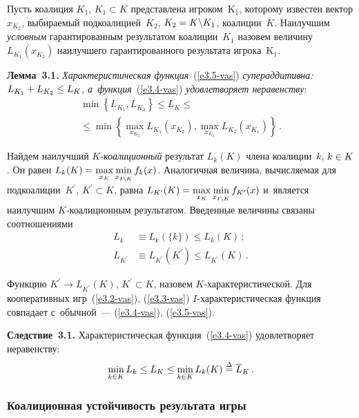 \begin{multicols}{2}
    Пусть коалиция $K_1$, $K_1\subset K$ представлена игроком~K$_1$, которому
известен вектор $x_{K_2}$, выбира\-емый подкоалицией~$K_2$, $K_2\hm=
K\backslash K_1$, коалиции~$K$. Наилучшим \textit{условным} гарантированным
результатом коалиции~$K_1$ назовем величину $L_{K_1}(x_{K_2})$ наилучшего
гарантированного результата игрока~K$_1$.

    \smallskip

    \noindent
    \textbf{Лемма~3.1.} \textit{Характеристическая функция}~(\ref{e3.5-vas})
\textit{супераддитивна: $L_{K_1}\hm+ L_{K_2}\hm\leq L_K$,
     а~функция}~(\ref{e3.4-vas}) \textit{удовлетворяет неравенству}:
    \begin{multline*}
    \min \left\{ L_{K_1}, L_{K_2}\right\} \leq L_K \leq{}\\
    {}\leq \min \left\{ \max\limits_{x_{K_2}}
L_{K_1}(x_{K_2}), \max\limits_{x_{K_1}} L_{K_2}(x_{K_1})\right\}\,.
    \end{multline*}

    \smallskip

    Найдем наилучший $K$-\textit{коалиционный} результат $L_k(K)$ члена
коалиции~$k$, $k\hm\in K$. Он равен $L_k(K)\hm= \max\limits_{x_K}
\min\limits_{x_{I\backslash K}} f_k(x)$. Аналогичная величина, вычисляемая для
подкоалиции~$K^\prime$, $K^\prime \subset K$, равна $L_{K^\prime}(K) \hm=
\max\limits_{x_K} \min\limits_{x_{I\backslash K}} f_{K^\prime}(x)$ и~является
наилучшим \mbox{$K$-коа}\-ли\-ци\-он\-ным результатом. Введенные величины связаны
соотношениями
    \begin{align*}
    L_k&\equiv L_k(\{k\})\leq L_k(K)\,;\\
    L_{K^\prime} &\equiv L_{K^\prime}
(K^\prime) \leq L_{K^\prime} (K)\,.
    \end{align*}

    Функцию $K^\prime \to L_{K^\prime} (K)$, $K^\prime \subset K$, назовем
    \mbox{$K$-ха}\-рак\-те\-ри\-сти\-че\-ской. Для кооперативных игр~(\ref{e3.2-vas}),
(\ref{e3.3-vas}) $I$-ха\-рак\-те\-ри\-сти\-че\-ская функция совпадает с~обычной~---
(\ref{e3.4-vas}), (\ref{e3.5-vas}).

    \smallskip

    \noindent
    \textbf{Следствие~3.1.} Характеристическая функция~(\ref{e3.4-vas})
удовлетворяет неравенству:
$$
\min\limits_{k\in K} L_k\leq L_K\leq
\min\limits_{k\in K} L_k(K)\stackrel{\Delta}{=} \overline{L}_K\,.
$$

    \subsubsection{Коалиционная устойчивость результата игры}


\end{multicols}

